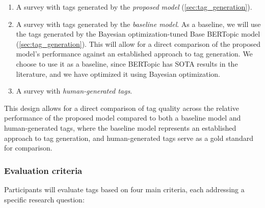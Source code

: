 \begin{enumerate}
\item A survey with tags generated by the \textit{proposed model} (\cref{sec:tag_generation}).
\item A survey with tags generated by the \textit{baseline model}. As a baseline, we will use the tags generated by the Bayesian optimization-tuned Base BERTopic model (\cref{sec:tag_generation}). This will allow for a direct comparison of the proposed model's performance against an established approach to tag generation. We choose to use it as a baseline, since BERTopic has SOTA results in the literature, and we have optimized it using Bayesian optimization.
\item A survey with \textit{human-generated tags}.
\end{enumerate}

This design allows for a direct comparison of tag quality across the relative performance of the proposed model compared to both a baseline model and human-generated tags, where the baseline model represents an established approach to tag generation, and human-generated tags serve as a gold standard for comparison.

\subsubsection{Evaluation criteria}
Participants will evaluate tags based on four main criteria, each addressing a specific research question:

